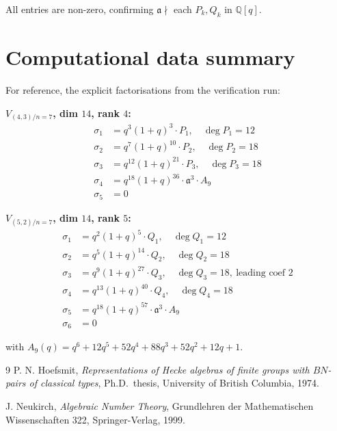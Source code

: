 \documentclass[11pt]{article}
\theoremstyle{plain}
\theoremstyle{definition}
\theoremstyle{remark}
\newcommand{\Q}{\mathbb{Q}}
\newcommand{\atom}{\mathfrak{a}}
\begin{document}
All entries are non-zero, confirming $\atom \nmid$ each $P_k, Q_k$ in $\Q[q]$.

\section{Computational data summary}

For reference, the explicit factorisations from the verification run:

\textbf{$V_{(4,3)/n=7}$, dim $14$, rank $4$:}
\begin{align*}
\sigma_1 &= q^3(1+q)^3 \cdot P_1, \quad \deg P_1 = 12 \\
\sigma_2 &= q^7(1+q)^{10} \cdot P_2, \quad \deg P_2 = 18 \\
\sigma_3 &= q^{12}(1+q)^{21} \cdot P_3, \quad \deg P_3 = 18 \\
\sigma_4 &= q^{18}(1+q)^{36} \cdot \atom^3 \cdot A_9 \\
\sigma_5 &= 0
\end{align*}

\textbf{$V_{(5,2)/n=7}$, dim $14$, rank $5$:}
\begin{align*}
\sigma_1 &= q^2(1+q)^5 \cdot Q_1, \quad \deg Q_1 = 12 \\
\sigma_2 &= q^5(1+q)^{14} \cdot Q_2, \quad \deg Q_2 = 18 \\
\sigma_3 &= q^9(1+q)^{27} \cdot Q_3, \quad \deg Q_3 = 18,\ \text{leading coef } 2 \\
\sigma_4 &= q^{13}(1+q)^{40} \cdot Q_4, \quad \deg Q_4 = 18 \\
\sigma_5 &= q^{18}(1+q)^{57} \cdot \atom^3 \cdot A_9 \\
\sigma_6 &= 0
\end{align*}

with $A_9(q) = q^6 + 12q^5 + 52q^4 + 88q^3 + 52q^2 + 12q + 1$.

\begin{thebibliography}{9}
 P. N. Hoefsmit, \emph{Representations of Hecke algebras of
finite groups with $BN$-pairs of classical types}, Ph.D.\ thesis, University of
British Columbia, 1974.

 J. Neukirch, \emph{Algebraic Number Theory}, Grundlehren der
Mathematischen Wissenschaften 322, Springer-Verlag, 1999.
\end{thebibliography}
\end{document}
